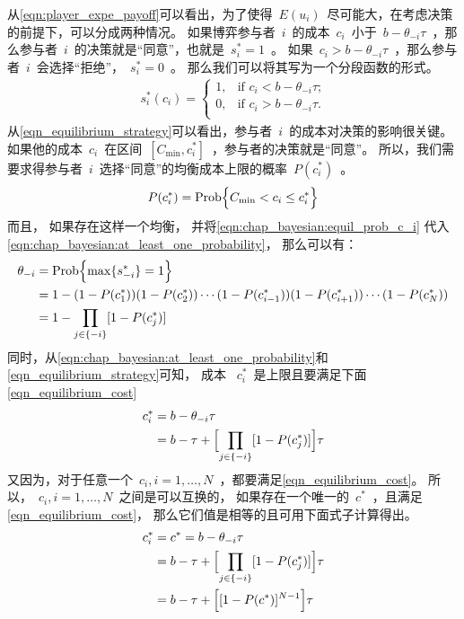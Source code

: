 从\eqref{eqn:player_expe_payoff}可以看出，为了使得~$E(u_i)$~尽可能大，在考虑决策的前提下，可以分成两种情况。
如果博弈参与者~$i$~的成本~$c_i$~小于~$b-\theta_{-i}\tau$~，那么参与者~$i$~的决策就是“同意”，也就是~$s_{i}^*=1$~。
如果~$c_i > b - \theta_{-i} \tau$~，那么参与者~$i$~会选择“拒绝”，~$s_i^* = 0$~。
那么我们可以将其写为一个分段函数的形式。
\begin{align}
    s_i^*(c_i) = \begin{cases} 1, &\text{if $c_i < b -\theta_{-i}\tau$;}\\
        0, &\text{if $c_i > b -\theta_{-i}\tau$.}\\ \end{cases} 
    \label{eqn_equilibrium_strategy} 
\end{align}
从\eqref{eqn_equilibrium_strategy}可以看出，参与者~$i$~的成本对决策的影响很关键。
如果他的成本~$c_i$~在区间~$ [C_{\min}, c_i^*] $~，参与者的决策就是“同意”。
所以，我们需要求得参与者~$i$~选择“同意”的均衡成本上限的概率~$P(c_i^*)$~。
\begin{align}
    P(c_i^*) = \hbox{Prob} \Bigl\{ C_{\min} < c_i \leq c_i^* \Bigr\} 
    \label{eqn:chap_bayesian:equil_prob_c_i}
\end{align}
而且，
如果存在这样一个均衡，
并将\eqref{eqn:chap_bayesian:equil_prob_c_i} 代入\eqref{eqn:chap_bayesian:at_least_one_probability}，
那么可以有：
\begin{align*} 
    \theta_{-i} &= \hbox{Prob} \Bigl\{ \max\{ s_{-i}^*\} = 1 \Bigr\} \\ 
    &= 1- (1-P(c_1^*))(1-P(c_2^*))\cdots(1-P(c_{i-1}^*)) (1-P(c_{i+1}^*)) \cdots(1-P(c_N^*)) \\ 
    &= 1- \prod_{j\in\{-i\}} [1-P(c_j^*)] 
\end{align*}
同时，从\eqref{eqn:chap_bayesian:at_least_one_probability}和\eqref{eqn_equilibrium_strategy}可知，
成本 ~$c_i^*$~是上限且要满足下面\eqref{eqn_equilibrium_cost}
\begin{align}
    c_i^* &= b - \theta_{-i} \tau \notag\\
    &= b - \tau + \Bigl[ \prod_{j \in\{-i\} } [1 - P(c_j^*) ] \Bigr] \tau
    \label{eqn_equilibrium_cost} 
\end{align}
又因为，对于任意一个~$c_i, i=1,\ldots, N$~，都要满足\eqref{eqn_equilibrium_cost}。
所以，~$c_i, i=1,\ldots, N$~之间是可以互换的，
如果存在一个唯一的~$c^*$~，且满足\eqref{eqn_equilibrium_cost}，
那么它们值是相等的且可用下面式子计算得出。
\begin{align}  
    c_i^* &= c^* = b - \theta_{-i} \tau \notag\\ 
    &= b - \tau  + \Bigl[ \prod_{j \in\{-i\} } [1 - P(c_j^*) ] \Bigr] \tau \notag\\ 
    &= b - \tau + \Bigl[ [1 - P(c^*)]^{N-1} \Bigr] \tau
\label{eqn:chap_bayesian:equilibrium_cost_equation}
\end{align}

